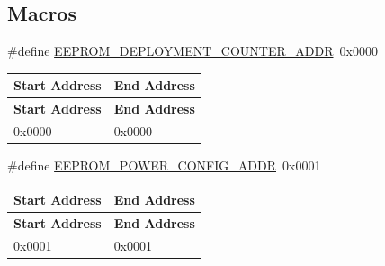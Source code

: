 \subsection*{Macros}
\begin{DoxyCompactItemize}
\item 
\mbox{\label{group__defines__eeprom__address__map_gaf8c8716a907b10b7d07c1d05f925915b}} 
\#define \hyperlink{group__defines__eeprom__address__map_gaf8c8716a907b10b7d07c1d05f925915b}{E\+E\+P\+R\+O\+M\+\_\+\+D\+E\+P\+L\+O\+Y\+M\+E\+N\+T\+\_\+\+C\+O\+U\+N\+T\+E\+R\+\_\+\+A\+D\+DR}~0x0000
\begin{DoxyCompactList}\small\item\em \tabulinesep=1mm
\begin{longtabu} spread 0pt [c]{*{2}{|X[-1]}|}
\hline
\rowcolor{\tableheadbgcolor}\textbf{ Start Address}&\textbf{ End Address  }\\
\endfirsthead
\hline
\endfoot
\hline
\rowcolor{\tableheadbgcolor}\textbf{ Start Address}&\textbf{ End Address  }\\
\endhead
0x0000&0x0000 \\
\end{longtabu}
\end{DoxyCompactList}\item 
\mbox{\label{group__defines__eeprom__address__map_gad0b4d3e4a81df862dfe961caaa6432c2}} 
\#define \hyperlink{group__defines__eeprom__address__map_gad0b4d3e4a81df862dfe961caaa6432c2}{E\+E\+P\+R\+O\+M\+\_\+\+P\+O\+W\+E\+R\+\_\+\+C\+O\+N\+F\+I\+G\+\_\+\+A\+D\+DR}~0x0001
\begin{DoxyCompactList}\small\item\em \tabulinesep=1mm
\begin{longtabu} spread 0pt [c]{*{2}{|X[-1]}|}
\hline
\rowcolor{\tableheadbgcolor}\textbf{ Start Address}&\textbf{ End Address  }\\
\endfirsthead
\hline
\endfoot
\hline
\rowcolor{\tableheadbgcolor}\textbf{ Start Address}&\textbf{ End Address  }\\
\endhead
0x0001&0x0001 \\
\end{longtabu}
\end{DoxyCompactList}\item 
\mbox{\label{group__defines__eeprom__address__map_gaaef7c132060420925a4b03f0763d1c19}} 

\end{DoxyCompactItemize}
